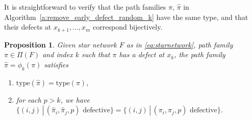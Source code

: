 \documentclass[12pt]{amsart}
\newtheorem{prop}[thm]{Proposition}
\theoremstyle{definition}
\numberwithin{equation}{section}
\newcommand{\sn}{\mathfrak{S}_n}
\newcommand{\ctr}[1]{{x}_{#1}}
\newcommand{\type}{\mathrm{type}}
\newcommand{\cnet}[1]{\mathcal F^\bullet_{#1}}
\begin{document}
It is straightforward to verify that the path families $\pi$, $\hat \pi$ in Algorithm~\ref{a:remove_early_defect_random_k} have the same type, and that their defects at $x_{k+1},\dotsc,x_m$ correspond bijectively.
\begin{prop}\label{p: one less defect condensed-adjusted}
Given star network 
    $F$ as in \eqref{eq:starnetwork}, 
    path family $\pi \in \Pi(F)$
    and index $k$ such that $\pi$ has a defect at $\ctr k$,
    the path family $\hat\pi = \phi_k(\pi)$ satisfies
    \begin{enumerate}
        \item $\type(\hat \pi) = \type(\pi)$,
        \item for each $p > k$, we have $\{(i,j) \,|\, (\hat\pi_i, \hat\pi_j, p) \text{ defective}\} = \{(i,j) \,|\, (\pi_i, \pi_j, p) \text{ defective}\}$.
\end{enumerate}
\end{prop}

    



\end{document}
